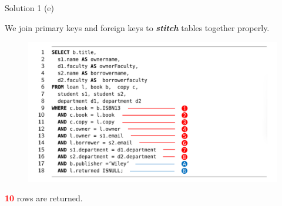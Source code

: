 \begin{frame}[fragile]{Solution 1 (e)}

We join primary keys and foreign keys to \textit{\textbf{stitch}} tables together properly. 
	
\begin{figure}
	\includegraphics[width=1\textwidth]{t2/images/t2-q1e.pdf}
\end{figure}

\textcolor{red}{\textbf{10}} rows are returned.

\end{frame}

